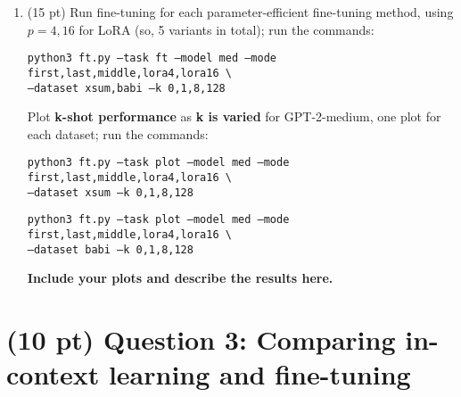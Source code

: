 \documentclass[12pt]{article}
\begin{document}
\begin{enumerate}
    \item (15 pt) Run fine-tuning for each parameter-efficient fine-tuning method, using $p=4,16$ for LoRA (so, 5 variants in total); run the commands:

    {\small \texttt{python3 ft.py --task ft --model med --mode first,last,middle,lora4,lora16 \textbackslash \\
    \phantom{asdf}--dataset xsum,babi --k 0,1,8,128}}

    Plot \textbf{k-shot performance} as \textbf{k is varied} for GPT-2-medium, one plot for each dataset; run the commands:

    {\small \texttt{python3 ft.py --task plot --model med --mode first,last,middle,lora4,lora16 \textbackslash \\
    \phantom{asdf}--dataset xsum --k 0,1,8,128}}

    {\small \texttt{python3 ft.py --task plot --model med --mode first,last,middle,lora4,lora16 \textbackslash \\
    \phantom{asdf}--dataset babi --k 0,1,8,128}}
    
    \textbf{\color{red}Include your plots and describe the results here.}

\end{enumerate}

\section*{(10 pt) Question 3: Comparing in-context learning and fine-tuning}
\end{document}
